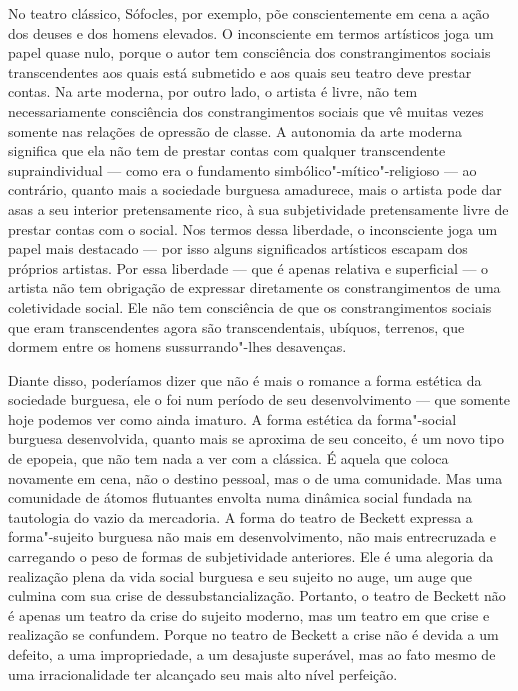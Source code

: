 No teatro clássico, Sófocles, por exemplo, põe conscientemente em cena a
ação dos deuses e dos homens elevados. O inconsciente em termos
artísticos joga um papel quase nulo, porque o autor tem consciência dos
constrangimentos sociais transcendentes aos quais está submetido e aos
quais seu teatro deve prestar contas. Na arte moderna, por outro lado, o
artista é livre, não tem necessariamente consciência dos
constrangimentos sociais que vê muitas vezes somente nas relações de
opressão de classe. A autonomia da arte moderna significa que ela não
tem de prestar contas com qualquer transcendente supraindividual --- como
era o fundamento simbólico"-mítico"-religioso --- ao contrário, quanto mais
a sociedade burguesa amadurece, mais o artista pode dar asas a seu
interior pretensamente rico, à sua subjetividade pretensamente livre de
prestar contas com o social. Nos termos dessa liberdade, o inconsciente
joga um papel mais destacado --- por isso alguns significados artísticos
escapam dos próprios artistas. Por essa liberdade --- que é apenas
relativa e superficial --- o artista não tem obrigação de expressar
diretamente os constrangimentos de uma coletividade social. Ele não tem
consciência de que os constrangimentos sociais que eram transcendentes
agora são transcendentais, ubíquos, terrenos, que dormem entre os homens
sussurrando"-lhes desavenças.

Diante disso, poderíamos dizer que não é mais o romance a forma estética
da sociedade burguesa, ele o foi num período de seu desenvolvimento ---
que somente hoje podemos ver como ainda imaturo. A forma estética da
forma"-social burguesa desenvolvida, quanto mais se aproxima de seu
conceito, é um novo tipo de epopeia, que não tem nada a ver com a
clássica. É aquela que coloca novamente em cena, não o destino pessoal,
mas o de uma comunidade. Mas uma comunidade de átomos flutuantes envolta
numa dinâmica social fundada na tautologia do vazio da mercadoria. A
forma do teatro de Beckett expressa a forma"-sujeito burguesa não mais em
desenvolvimento, não mais entrecruzada e carregando o peso de formas de
subjetividade anteriores. Ele é uma alegoria da realização plena da vida
social burguesa e seu sujeito no auge, um auge que culmina com sua crise
de dessubstancialização. Portanto, o teatro de Beckett não é apenas um
teatro da crise do sujeito moderno, mas um teatro em que crise e
realização se confundem. Porque no teatro de Beckett a crise não é
devida a um defeito, a uma impropriedade, a um desajuste superável, mas
ao fato mesmo de uma irracionalidade ter alcançado seu mais alto nível
perfeição.

